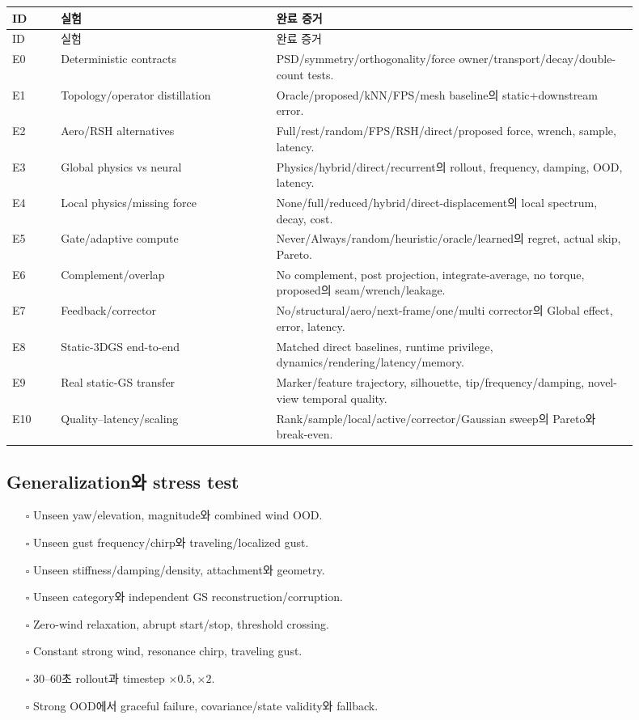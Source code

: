\documentclass[10pt,a4paper]{article}
\newcommand{\todo}{\textcolor{TodoGray}{\(\square\)}}
\begin{document}
\begin{longtable}{L{0.07\linewidth}L{0.31\linewidth}L{0.52\linewidth}}
\toprule
ID & 실험 & 완료 증거 \\
\midrule
\endfirsthead
\toprule
ID & 실험 & 완료 증거 \\
\midrule
\endhead
E0 & Deterministic contracts & PSD/symmetry/orthogonality/force owner/transport/decay/double-count tests. \\
E1 & Topology/operator distillation & Oracle/proposed/kNN/FPS/mesh baseline의 static+downstream error. \\
E2 & Aero/RSH alternatives & Full/rest/random/FPS/RSH/direct/proposed force, wrench, sample, latency. \\
E3 & Global physics vs neural & Physics/hybrid/direct/recurrent의 rollout, frequency, damping, OOD, latency. \\
E4 & Local physics/missing force & None/full/reduced/hybrid/direct-displacement의 local spectrum, decay, cost. \\
E5 & Gate/adaptive compute & Never/Always/random/heuristic/oracle/learned의 regret, actual skip, Pareto. \\
E6 & Complement/overlap & No complement, post projection, integrate-average, no torque, proposed의 seam/wrench/leakage. \\
E7 & Feedback/corrector & No/structural/aero/next-frame/one/multi corrector의 Global effect, error, latency. \\
E8 & Static-3DGS end-to-end & Matched direct baselines, runtime privilege, dynamics/rendering/latency/memory. \\
E9 & Real static-GS transfer & Marker/feature trajectory, silhouette, tip/frequency/damping, novel-view temporal quality. \\
E10 & Quality--latency/scaling & Rank/sample/local/active/corrector/Gaussian sweep의 Pareto와 break-even. \\
\bottomrule
\end{longtable}

\subsection*{Generalization와 stress test}

\begin{itemize}
  \item[\todo] Unseen yaw/elevation, magnitude와 combined wind OOD.
  \item[\todo] Unseen gust frequency/chirp와 traveling/localized gust.
  \item[\todo] Unseen stiffness/damping/density, attachment와 geometry.
  \item[\todo] Unseen category와 independent GS reconstruction/corruption.
  \item[\todo] Zero-wind relaxation, abrupt start/stop, threshold crossing.
  \item[\todo] Constant strong wind, resonance chirp, traveling gust.
  \item[\todo] 30--60초 rollout과 timestep \(\times0.5,\times2\).
  \item[\todo] Strong OOD에서 graceful failure, covariance/state validity와 fallback.
\end{itemize}
\end{document}
